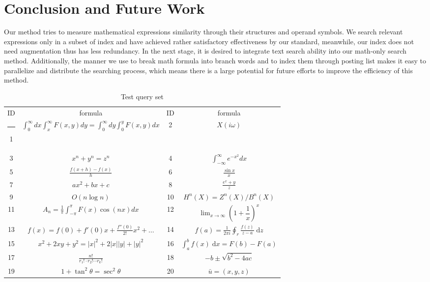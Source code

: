 \documentclass{acm_proc_article-sp}
\makeatletter
\newcommand{\thickhline}{%
    \noalign {\ifnum 0=`}\fi \hrule height 1pt
    \futurelet \reserved@a \@xhline
}
\makeatother
\begin{document}
\section{Conclusion and Future Work}
Our method tries to measure mathematical expressions similarity through their structures and operand symbols. 
We search relevant expressions only in a subset of index and have achieved rather satisfactory effectiveness by our standard, meanwhile, our index does not need augmentation thus has less redundancy.
In the next stage, it is desired to integrate text search ability into our math-only search method. 
Additionally, the manner we use to break math formula into branch words and to index them through posting list makes it easy to parallelize and distribute the searching process,
which means there is a large potential for future efforts to improve the efficiency of this method.



\begin{table*}
\begin{center}
\renewcommand{\arraystretch}{1.5}
\begin{tabular}{|c|c||c|c|}\hline
ID & formula & ID & formula \\ \thickhline
1 & 
$\int_0^\infty dx \int_{x}^\infty F(x,y)dy  =\int_0^\infty dy \int_{0}^y F(x,y)dx$ &
2 & 
$X(i\omega)$ \\\hline

3 & 
$x^n + y^n=z^n$ &
4 & 
$\int^{\infty}_{-\infty} e^{-x^2} dx$ \\\hline

5 & 
$\frac{f(x+h)-f(x)}{h}$ &
6 & 
$\frac {\sin x} x$ \\\hline

7 & 
$ax^2 + bx +c$ &
8 & 
$\frac {e^x + y}{z}$ \\\hline

9 & 
$O(n \log n)$ &
10 & 
$H^n(X) = Z^n (X) / B^n(X)$ \\\hline

11 & 
$A_n = \frac 1 \pi \int_{-\pi}^\pi F(x) \cos(nx) dx$ &
12 & 
$\lim_{x \to \infty} (1 + \dfrac 1x)^x$ \\\hline

13 & 
$f(x) = f(0) + f'(0)x + \frac{f''(0)}{2!} x^2 + \ldots$ &
14 & 
$f(a) = \frac 1 {2 \pi i} \oint_r \frac{f(z)}{z-a} \;\mathrm{d}z$ \\\hline

15 & 
$x^2 + 2xy + y^2 = |x|^2 + 2|x||y| + |y| ^2$ &
16 & 
$\int_a^b f(x) \;\mathrm{d}x = F(b) - F(a)$ \\\hline

17 & 
$\frac {n!}{r_1! \cdot r_2! \cdots r_k!}$ &
18 & 
$-b \pm \sqrt{b^2 - 4ac}$ \\\hline

19 & 
$1+\tan^2 \theta = \sec^2 \theta$ &
20 & 
$\bar{u} = (x,y,z)$ \\\hline

\end{tabular}
\renewcommand{\arraystretch}{1}
\end{center}
\caption{Test query set}\label{TestQ}
\end{table*}
\end{document}
